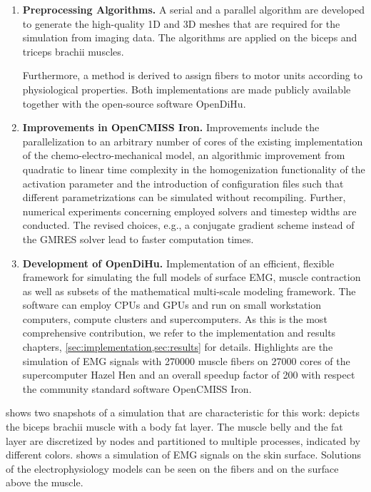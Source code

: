 \begin{enumerate}[label=(\roman*)]
\item \textbf{Preprocessing Algorithms.} 
A serial and a parallel algorithm are developed to generate the high-quality 1D and 3D meshes that are required for the simulation from imaging data. The algorithms are applied on the biceps and triceps brachii muscles.

Furthermore, a method is derived to assign fibers to motor units according to physiological properties. Both implementations are made publicly available together with the open-source software OpenDiHu.
\item \textbf{Improvements in OpenCMISS Iron.} Improvements include the parallelization to an arbitrary number of cores of the existing implementation of the chemo-electro-mechanical model, an algorithmic improvement from quadratic to linear time complexity in the homogenization functionality of the activation parameter and the introduction of configuration files such that different parametrizations can be simulated without recompiling. Further, numerical experiments concerning employed solvers and timestep widths are conducted. The revised choices, e.g., a conjugate gradient scheme instead of the GMRES solver lead to faster computation times.
\item \textbf{Development of OpenDiHu.} Implementation of an efficient, flexible framework for simulating the full models of surface EMG, muscle contraction as well as subsets of the mathematical multi-scale modeling framework. The software can employ CPUs and GPUs and run on small workstation computers, compute clusters and supercomputers.
As this is the most comprehensive contribution, we refer to the implementation and results chapters, \cref{sec:implementation,sec:results} for details.
Highlights are the simulation of EMG signals with \num{270000} muscle fibers on \num{27000} cores of the supercomputer Hazel Hen and an overall speedup factor of 200 with respect the community standard software OpenCMISS Iron.
\end{enumerate}

 shows two snapshots of a simulation that are characteristic for this work:  depicts the biceps brachii muscle with a body fat layer. The muscle belly and the fat layer are discretized by nodes and partitioned to multiple processes, indicated by different colors.
 shows a simulation of EMG signals on the skin surface. Solutions of the  electrophysiology models can be seen on the fibers and on the surface above the muscle.

